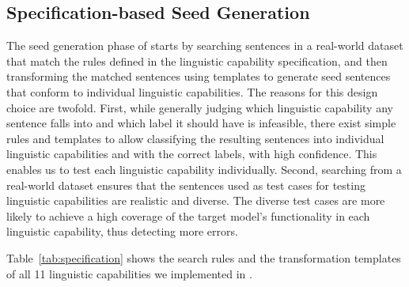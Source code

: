 \subsection{Specification-based Seed Generation}
The seed generation phase of \tool starts by searching sentences in a
real-world dataset that match the rules defined in the linguistic
capability specification, and then transforming the matched sentences
using templates to generate seed sentences that conform to individual
linguistic capabilities. The reasons for this design choice are
twofold.  First, while generally judging which linguistic capability
any sentence falls into and which label it should have is infeasible,
there exist simple rules and templates to allow classifying the
resulting sentences into individual linguistic capabilities and with
the correct labels, with high confidence.  This enables us to test
each linguistic capability individually.  Second, searching from a
real-world dataset ensures that the sentences used as test cases for
testing linguistic capabilities are realistic and diverse. The diverse
test cases are more likely to achieve a high coverage of the target
model's functionality in each linguistic capability, thus detecting
more errors.


Table~\ref{tab:specification} shows the search rules and the
transformation templates of all 11 linguistic capabilities we
implemented in \tool{}. 

